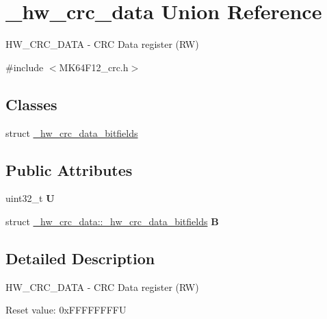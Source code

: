 \hypertarget{union__hw__crc__data}{}\section{\+\_\+hw\+\_\+crc\+\_\+data Union Reference}
\label{union__hw__crc__data}


H\+W\+\_\+\+C\+R\+C\+\_\+\+D\+A\+TA -\/ C\+RC Data register (RW)  




{\ttfamily \#include $<$M\+K64\+F12\+\_\+crc.\+h$>$}

\subsection*{Classes}
\begin{DoxyCompactItemize}
\item 
struct \hyperlink{struct__hw__crc__data_1_1__hw__crc__data__bitfields}{\+\_\+hw\+\_\+crc\+\_\+data\+\_\+bitfields}
\end{DoxyCompactItemize}
\subsection*{Public Attributes}
\begin{DoxyCompactItemize}
\item 
uint32\+\_\+t {\bfseries U}\hypertarget{union__hw__crc__data_a7b1ac8ae523b49ca7ab629f5a570258c}{}\label{union__hw__crc__data_a7b1ac8ae523b49ca7ab629f5a570258c}

\item 
struct \hyperlink{struct__hw__crc__data_1_1__hw__crc__data__bitfields}{\+\_\+hw\+\_\+crc\+\_\+data\+::\+\_\+hw\+\_\+crc\+\_\+data\+\_\+bitfields} {\bfseries B}\hypertarget{union__hw__crc__data_a886ef8eceb46841b64a5370b959f02ec}{}\label{union__hw__crc__data_a886ef8eceb46841b64a5370b959f02ec}

\end{DoxyCompactItemize}


\subsection{Detailed Description}
H\+W\+\_\+\+C\+R\+C\+\_\+\+D\+A\+TA -\/ C\+RC Data register (RW) 

Reset value\+: 0x\+F\+F\+F\+F\+F\+F\+F\+FU

